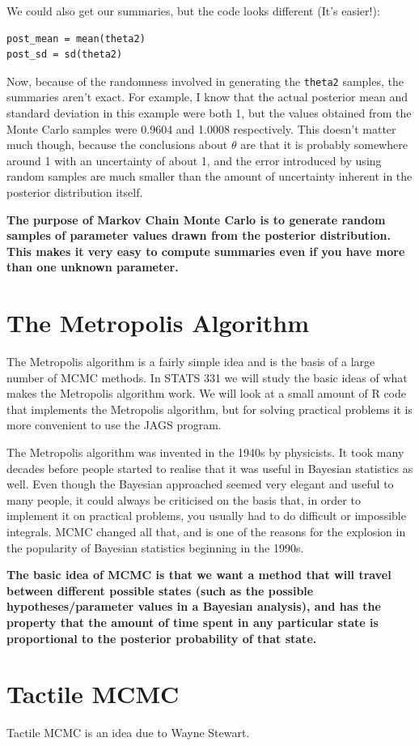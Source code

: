 We could also get our summaries, but the code looks different (It's easier!):
\begin{verbatim}
post_mean = mean(theta2)
post_sd = sd(theta2)
\end{verbatim}
Now, because of the randomness involved in generating the {\tt theta2} samples,
the summaries aren't exact. For example, I know that the actual posterior mean
and standard deviation in this example were both 1, but the values obtained
from the Monte Carlo samples were 0.9604 and 1.0008 respectively. This doesn't
matter much though, because the conclusions about $\theta$ are that it is probably
somewhere around 1 with an uncertainty of about 1, and the error introduced by
using random samples are much smaller than the amount of uncertainty inherent
in the posterior distribution itself.

\begin{framed}
{\bf
The purpose of Markov Chain Monte Carlo is to generate random samples of
parameter values drawn from the posterior distribution. This makes it very easy
to compute summaries even if you have more than one unknown parameter.}
\end{framed}


\section{The Metropolis Algorithm}
The Metropolis algorithm is a fairly simple idea and is the basis of a large
number of MCMC methods. In STATS 331 we will study the basic ideas of what
makes the Metropolis algorithm work. We will look at a small amount of R code
that implements the Metropolis algorithm, but for solving practical problems
it is more convenient to use the JAGS program.

The Metropolis algorithm was invented in the 1940s by physicists. It took
many decades before people started to realise that it was useful in Bayesian
statistics as well. Even though the Bayesian approached seemed very elegant and
useful to many people, it could always be criticised on the basis that, in order
to implement it on practical problems, you usually had to do difficult or
impossible integrals. MCMC changed all that, and is one of the reasons for the
explosion in the popularity of Bayesian statistics beginning in the 1990s.

\begin{framed}
{\bf
The basic idea of MCMC is that we want a method that will travel between
different possible states (such as the possible hypotheses/parameter values in
a Bayesian analysis), and has the property that the amount of time spent in
any particular state is proportional to the posterior probability of that state.}
\end{framed}



\section{Tactile MCMC}

Tactile MCMC is an idea due to Wayne Stewart.
